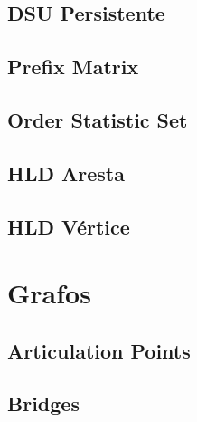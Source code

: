 \documentclass[12pt, a4paper, twoside]{article}
\begin{document}
\newpage

\subsection{DSU Persistente}


\newpage

\subsection{Prefix Matrix}


\newpage

\subsection{Order Statistic Set}


\newpage

\subsection{HLD Aresta}


\newpage

\subsection{HLD Vértice}


\newpage

%
%

\section{Grafos}

\subsection{Articulation Points}


\newpage

\subsection{Bridges}

\end{document}
